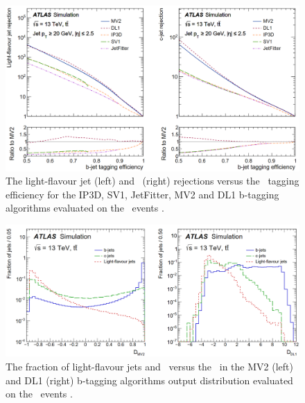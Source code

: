 \documentclass[letterpaper,12pt]{article}
\begin{document}
\begin{figure}[!h]
	\includegraphics[width=1\textwidth]{FTAG_plots/b-tagging-perfermance.png}
	\caption{The light-flavour jet (left) and \cjet\ (right) rejections versus 
	the \bjet\ tagging efficiency for the IP3D, SV1, JetFitter, MV2 and
	DL1 b-tagging algorithms evaluated on the \ttbar\ events
	 \cite{FTAG-2018-01}.}\label{fig:b-tagging-performance}
\end{figure}


\begin{figure}[!h]
	\includegraphics[width=1\textwidth]{FTAG_plots/b-tagging-score.png}
	\caption{The fraction of light-flavour jets and \cjets\ versus 
	the \bjets\ in the MV2 (left) and
	DL1 (right) b-tagging algorithms output distribution 
	evaluated on the \ttbar\ events
	 \cite{FTAG-2018-01}.}\label{fig:b-tagging-score}
\end{figure}
\end{document}
